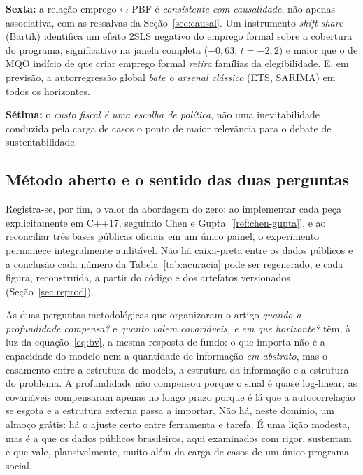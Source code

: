 \documentclass[12pt,a4paper,oneside]{article}
\newcommand{\C}[1]{[\ref{#1}]}
\begin{document}
\textbf{Sexta:} a relação emprego$\leftrightarrow$PBF é \emph{consistente
com causalidade}, não apenas associativa, com as ressalvas da
Seção~\ref{sec:causal}. Um instrumento \emph{shift-share} (Bartik) identifica
um efeito 2SLS negativo do emprego formal sobre a cobertura do programa,
significativo na janela completa ($-0{,}63$, $t=-2{,}2$) e maior que o de
MQO \textemdash{} indício de que criar emprego formal \emph{retira} famílias
da elegibilidade. E, em previsão, a autorregressão global \emph{bate o
arsenal clássico} (ETS, SARIMA) em todos os horizontes.

\textbf{Sétima:} o \emph{custo fiscal é uma escolha de política}, não uma
inevitabilidade conduzida pela carga de casos \textemdash{} o ponto de
maior relevância para o debate de sustentabilidade.

\subsection{Método aberto e o sentido das duas perguntas}

Registra-se, por fim, o valor da abordagem do zero: ao implementar cada
peça explicitamente em C++17, seguindo Chen e Gupta~\C{ref:chen-gupta}, e ao
reconciliar três bases públicas oficiais em um único painel, o experimento
permanece integralmente auditável. Não há caixa-preta entre os dados
públicos e a conclusão \textemdash{} cada número da Tabela~\ref{tab:acuracia}
pode ser regenerado, e cada figura, reconstruída, a partir do código e dos
artefatos versionados (Seção~\ref{sec:reprod}).

As duas perguntas metodológicas que organizaram o artigo \textemdash{}
\emph{quando a profundidade compensa?} e \emph{quanto valem covariáveis, e
em que horizonte?} \textemdash{} têm, à luz da
equação~\eqref{eq:bv}, a mesma resposta de fundo: o que importa não é a
capacidade do modelo nem a quantidade de informação \emph{em abstrato}, mas
o casamento entre a estrutura do modelo, a estrutura da informação e a
estrutura do problema. A profundidade não compensou porque o sinal é quase
log-linear; as covariáveis compensaram apenas no longo prazo porque é lá
que a autocorrelação se esgota e a estrutura externa passa a importar. Não
há, neste domínio, um almoço grátis: há o ajuste certo entre ferramenta e
tarefa. É uma lição modesta, mas é a que os dados públicos brasileiros, aqui
examinados com rigor, sustentam \textemdash{} e que vale, plausivelmente,
muito além da carga de casos de um único programa social.

\newpage
\end{document}
